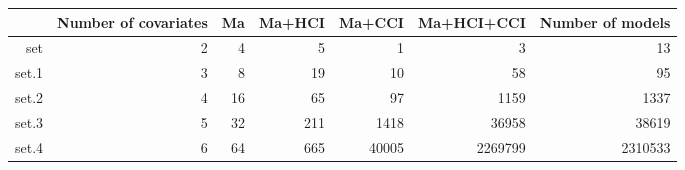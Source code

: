 \begin{table}[ht]
\centering
\begin{tabular}{rrrrrrr}
  \hline
 & Number of covariates & Ma & Ma+HCI & Ma+CCI & Ma+HCI+CCI & Number of models \\ 
  \hline
set & 2 & 4 & 5 & 1 & 3 & 13 \\ 
  set.1 & 3 & 8 & 19 & 10 & 58 & 95 \\ 
  set.2 & 4 & 16 & 65 & 97 & 1159 & 1337 \\ 
  set.3 & 5 & 32 & 211 & 1418 & 36958 & 38619 \\ 
  set.4 & 6 & 64 & 665 & 40005 & 2269799 & 2310533 \\ 
   \hline
\end{tabular}
\end{table}

